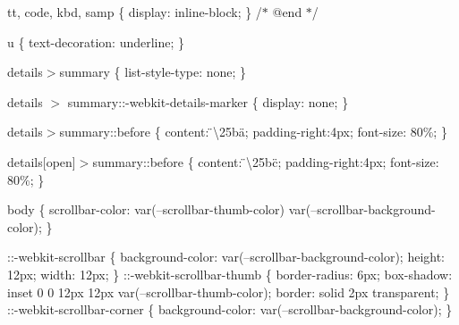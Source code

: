 tt, code, kbd, samp \{ display\+: inline-\/block; \} /\texorpdfstring{$\ast$}{*} @end \texorpdfstring{$\ast$}{*}/

u \{ text-\/decoration\+: underline; \}

details\texorpdfstring{$>$}{>}summary \{ list-\/style-\/type\+: none; \}

details \texorpdfstring{$>$}{>} summary\+:\+:-\/webkit-\/details-\/marker \{ display\+: none; \}

details\texorpdfstring{$>$}{>}summary\+::before \{ content\+: \"{}\textbackslash{}25ba\"{}; padding-\/right\+:4px; font-\/size\+: 80\%; \}

details\mbox{[}open\mbox{]}\texorpdfstring{$>$}{>}summary\+::before \{ content\+: \"{}\textbackslash{}25bc\"{}; padding-\/right\+:4px; font-\/size\+: 80\%; \}

body \{ scrollbar-\/color\+: var(--scrollbar-\/thumb-\/color) var(--scrollbar-\/background-\/color); \}

\+::-\/webkit-\/scrollbar \{ background-\/color\+: var(--scrollbar-\/background-\/color); height\+: 12px; width\+: 12px; \} \+::-\/webkit-\/scrollbar-\/thumb \{ border-\/radius\+: 6px; box-\/shadow\+: inset 0 0 12px 12px var(--scrollbar-\/thumb-\/color); border\+: solid 2px transparent; \} \+::-\/webkit-\/scrollbar-\/corner \{ background-\/color\+: var(--scrollbar-\/background-\/color); \} 